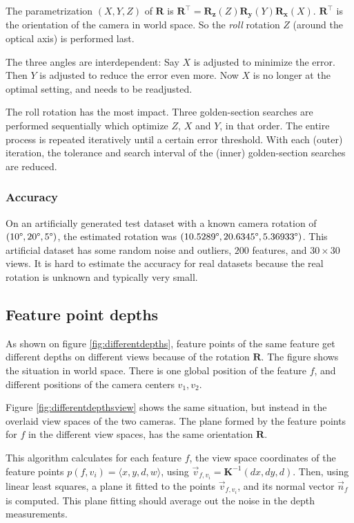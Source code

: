 \documentclass[11pt]{scrreprt}
\newcommand{\matr}[1]{\mathbf{#1}}
\newcommand{\transpose}[1]{#1^\intercal}
\newcommand{\degr}{\text{\textdegree}}
\begin{document}
The parametrization $(X,Y,Z)$ of $\matr{R}$ is $\transpose{\matr{R}} = \matr{R_z}(Z) \matr{R_y}(Y) \matr{R_x}(X)$. $\transpose{\matr{R}}$ is the orientation of the camera in world space. So the \emph{roll} rotation $Z$ (around the optical axis) is performed last.

The three angles are interdependent: Say $X$ is adjusted to minimize the error. Then $Y$ is adjusted to reduce the error even more. Now $X$ is no longer at the optimal setting, and needs to be readjusted.

The roll rotation has the most impact. Three golden-section searches are performed sequentially which optimize $Z$, $X$ and $Y$, in that order. The entire process is repeated iteratively until a certain error threshold. With each (outer) iteration, the tolerance and search interval of the (inner) golden-section searches are reduced.

\subsubsection{Accuracy}
On an artificially generated test dataset with a known camera rotation of $(10\degr, 20\degr, 5\degr)$, the estimated rotation was $(10.5289\degr, 20.6345\degr, 5.36933\degr)$. This artificial dataset has some random noise and outliers, $200$ features, and $30 \times 30$ views. It is hard to estimate the accuracy for real datasets because the real rotation is unknown and typically very small.


\subsection{Feature point depths}
\label{sec:depthrot}
As shown on figure \ref{fig:differentdepths}, feature points of the same feature get different depths on different views because of the rotation $\matr{R}$. The figure shows the situation in world space. There is one global position of the feature $f$, and different positions of the camera centers $v_1, v_2$.

Figure \ref{fig:differentdepthsview} shows the same situation, but instead in the overlaid view spaces of the two cameras. The plane formed by the feature points for $f$ in the different view spaces, has the same orientation $\matr{R}$.

This algorithm calculates for each feature $f$, the view space coordinates of the feature points $p(f,v_i) = \langle x,y,d,w\rangle$, using $\vec{v}_{f,v_i} = \matr{K}^{-1} (d x, d y, d)$. Then, using linear least squares, a plane it fitted to the points $\vec{v}_{f,v_i}$, and its normal vector $\vec{n}_f$ is computed. This plane fitting should average out the noise in the depth measurements.
\end{document}
